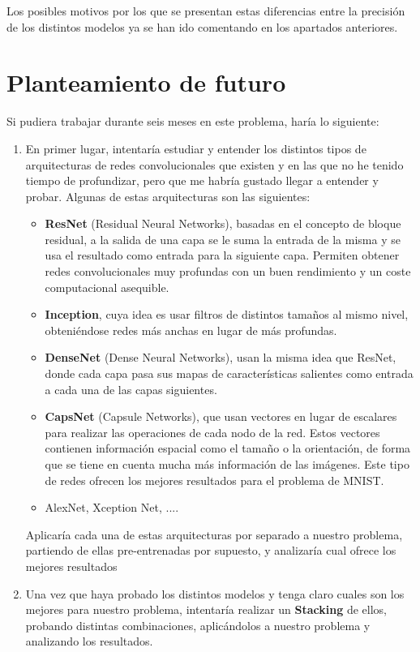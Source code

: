 \documentclass[a4paper,11pt]{article}
\begin{document}
Los posibles motivos por los que se presentan estas diferencias entre la precisión de los distintos modelos ya se han ido comentando en los apartados anteriores. 
  
\section{Planteamiento de futuro}
Si pudiera trabajar durante seis meses en este problema, haría lo siguiente:
\begin{enumerate}
	\item En primer lugar, intentaría estudiar y entender los distintos tipos de arquitecturas de redes convolucionales que existen y en las que no he tenido tiempo de profundizar, pero que me habría gustado llegar a entender y probar.  Algunas de estas arquitecturas son las siguientes:
	\begin{itemize}
		\item \textbf{ResNet} (Residual Neural Networks), basadas en el concepto de bloque residual, a la salida de una capa se le suma la entrada de la misma y se usa el resultado como entrada para la siguiente capa. Permiten obtener redes convolucionales muy profundas con un buen rendimiento y un coste computacional asequible.
		\item \textbf{Inception}, cuya idea es usar filtros de distintos tamaños al mismo nivel, obteniéndose redes más anchas en lugar de más profundas. 
		\item \textbf{DenseNet} (Dense Neural Networks), usan la misma idea que ResNet, donde cada capa pasa sus mapas de características salientes como entrada a cada una de las capas siguientes.
		\item \textbf{CapsNet} (Capsule Networks), que usan vectores en lugar de escalares para realizar las operaciones de cada nodo de la red. Estos vectores contienen información espacial como el tamaño o la orientación, de forma que se tiene en cuenta mucha más información de las imágenes. Este tipo de redes ofrecen los mejores resultados para el problema de MNIST. 
		\item AlexNet, Xception Net, ....
	\end{itemize}
	Aplicaría cada una de estas arquitecturas por separado a nuestro problema, partiendo de ellas pre-entrenadas por supuesto, y analizaría cual ofrece los mejores resultados
	\item Una vez que haya probado los distintos modelos y tenga claro cuales son los mejores para nuestro problema, intentaría realizar un \textbf{Stacking} de ellos, probando distintas combinaciones, aplicándolos a nuestro problema y analizando los resultados.

\end{enumerate}
\end{document}
